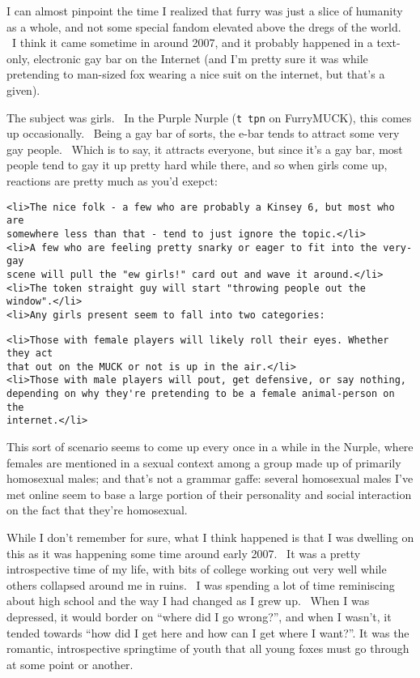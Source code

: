 I can almost pinpoint the time I realized that furry was just a slice of
humanity as a whole, and not some special fandom elevated above the
dregs of the world. ~I think it came sometime in around 2007, and it
probably happened in a text-only, electronic gay bar on the Internet
(and I'm pretty sure it was while pretending to man-sized fox wearing a
nice suit on the internet, but that's a given).

The subject was girls. ~In the Purple Nurple (\texttt{t\ tpn} on
FurryMUCK), this comes up occasionally. ~Being a gay bar of sorts, the
e-bar tends to attract some very gay people. ~Which is to say, it
attracts everyone, but since it's a gay bar, most people tend to gay it
up pretty hard while there, and so when girls come up, reactions are
pretty much as you'd exepct:

\begin{verbatim}
<li>The nice folk - a few who are probably a Kinsey 6, but most who are
somewhere less than that - tend to just ignore the topic.</li>
<li>A few who are feeling pretty snarky or eager to fit into the very-gay
scene will pull the "ew girls!" card out and wave it around.</li>
<li>The token straight guy will start "throwing people out the window".</li>
<li>Any girls present seem to fall into two categories:
\end{verbatim}

\begin{verbatim}
<li>Those with female players will likely roll their eyes. Whether they act
that out on the MUCK or not is up in the air.</li>
<li>Those with male players will pout, get defensive, or say nothing,
depending on why they're pretending to be a female animal-person on the
internet.</li>
\end{verbatim}

This sort of scenario seems to come up every once in a while in the
Nurple, where females are mentioned in a sexual context among a group
made up of primarily homosexual males; and that's not a grammar gaffe:
several homosexual males I've met online seem to base a large portion of
their personality and social interaction on the fact that they're
homosexual.

While I don't remember for sure, what I think happened is that I was
dwelling on this as it was happening some time around early 2007. ~It
was a pretty introspective time of my life, with bits of college working
out very well while others collapsed around me in ruins. ~I was spending
a lot of time reminiscing about high school and the way I had changed as
I grew up. ~When I was depressed, it would border on ``where did I go
wrong?'', and when I wasn't, it tended towards ``how did I get here and
how can I get where I want?''. It was the romantic, introspective
springtime of youth that all young foxes must go through at some point
or another.


